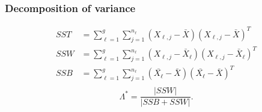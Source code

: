 \documentclass[aspectratio=169,10pt,t]{beamer}
\begin{document}
\begin{frame}[t]
	\frametitle{Decomposition of variance}
	\[
		\begin{aligned}
			SST &=
			\sum^{g}_{\ell=1} 
			\sum^{n_{\ell}}_{j=1} 
			\left( X_{\ell,j}- \bar{X} \right) 
			\left( X_{\ell,j}- \bar{X} \right) ^{T}\\
			SSW &=
			\sum^{g}_{\ell=1} 
			\sum^{n_{\ell}}_{j=1} 
			\left( X_{\ell,j}- \bar{X}_{\ell} \right) 
			\left( X_{\ell,j}- \bar{X}_{\ell} \right) ^{T}\\
			SSB &=
			\sum^{g}_{\ell=1} 
			\sum^{n_\ell}_{j=1} 
			\left( \bar{X_{\ell}}- \bar{X} \right) 
			\left( \bar{X_{\ell}}- \bar{X} \right) ^{T}\\
		\end{aligned}
	\] 
	\vspace{1cm}
	\pause
	\[
		\Lambda ^{*} = \frac{|SSW|}{|SSB + SSW |} 
	.\] 

\end{frame}
\end{document}
